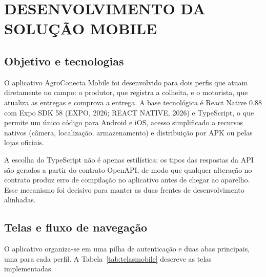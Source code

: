 \section{DESENVOLVIMENTO DA SOLUÇÃO MOBILE}

\subsection{Objetivo e tecnologias}

O aplicativo AgroConecta Mobile foi desenvolvido para dois perfis que atuam
diretamente no campo: o produtor, que registra a colheita, e o motorista, que
atualiza as entregas e comprova a entrega. A base tecnológica é React Native
0.88 com Expo SDK 58 (EXPO, 2026; REACT NATIVE, 2026) e TypeScript, o que permite um único código para Android e
iOS, acesso simplificado a recursos nativos (câmera, localização, armazenamento)
e distribuição por APK ou pelas lojas oficiais.

A escolha do TypeScript não é apenas estilística: os tipos das respostas da API
são gerados a partir do contrato OpenAPI, de modo que qualquer alteração no
contrato produz erro de compilação no aplicativo antes de chegar ao aparelho.
Esse mecanismo foi decisivo para manter as duas frentes de desenvolvimento
alinhadas.

\subsection{Telas e fluxo de navegação}

O aplicativo organiza-se em uma pilha de autenticação e duas abas principais,
uma para cada perfil. A Tabela~\ref{tab:telasmobile} descreve as telas
implementadas.


